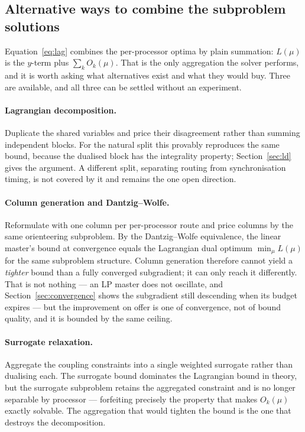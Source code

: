 \documentclass[11pt,a4paper]{article}
\begin{document}


\subsection{Alternative ways to combine the subproblem solutions}\label{sec:combining}

Equation~\eqref{eq:lag} combines the per-processor optima by plain summation:
$L(\mu)$ is the $y$-term plus $\sum_k O_k(\mu)$. That is the only aggregation the
solver performs, and it is worth asking what alternatives exist and what they
would buy. Three are available, and all three can be settled without an
experiment.

\paragraph{Lagrangian decomposition.} Duplicate the shared variables and price
their disagreement rather than summing independent blocks. For the natural split
this provably reproduces the same bound, because the dualised block has the
integrality property; Section~\ref{sec:ld} gives the argument. A different split,
separating routing from synchronisation timing, is not covered by it and remains
the one open direction.

\paragraph{Column generation and Dantzig--Wolfe.} Reformulate with one column per
per-processor route and price columns by the same orienteering subproblem. By the
Dantzig--Wolfe equivalence, the linear master's bound at convergence equals the
Lagrangian dual optimum $\min_\mu L(\mu)$ for the same subproblem structure. Column
generation therefore cannot yield a \emph{tighter} bound than a fully converged
subgradient; it can only reach it differently. That is not nothing --- an LP master
does not oscillate, and Section~\ref{sec:convergence} shows the subgradient still
descending when its budget expires --- but the improvement on offer is one of
convergence, not of bound quality, and it is bounded by the same ceiling.

\paragraph{Surrogate relaxation.} Aggregate the coupling constraints into a single
weighted surrogate rather than dualising each. The surrogate bound dominates the
Lagrangian bound in theory, but the surrogate subproblem retains the aggregated
constraint and is no longer separable by processor --- forfeiting precisely the
property that makes $O_k(\mu)$ exactly solvable. The aggregation that would
tighten the bound is the one that destroys the decomposition.
\end{document}
